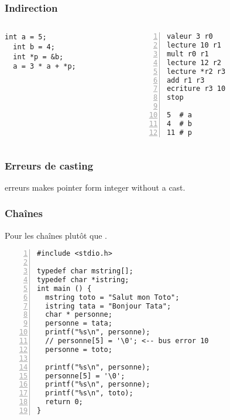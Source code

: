 \documentclass[xcolor=pdftex,svgnames,table]{beamer}
\begin{document}
\begin{frame}[fragile]
  \frametitle{Indirection}

\begin{columns}
\begin{column}[b]{3.7cm}

\begin{lstlisting}[basicstyle=\ttfamily]
  int a = 5;
  int b = 4;
  int *p = &b;
  a = 3 * a + *p;
\end{lstlisting}

\end{column}
\begin{column}[b]{3.7cm}
\begin{lstlisting}[numbers=left,basicstyle=\ttfamily\small]
valeur 3 r0
lecture 10 r1
mult r0 r1
lecture 12 r2
lecture *r2 r3
add r1 r3
ecriture r3 10
stop

5  # a
4  # b
11 # p
\end{lstlisting}
\end{column}
\end{columns}
\end{frame}

\begin{frame}
  \frametitle{Erreurs de casting}
erreurs makes pointer form integer without a cast.
\end{frame}

\begin{frame}[fragile]
  \frametitle{Chaînes}

Pour les chaînes  plutôt que .

\begin{lstlisting}[numbers=left,basicstyle=\ttfamily\small]
#include <stdio.h>

typedef char mstring[];
typedef char *istring;
int main () {
  mstring toto = "Salut mon Toto";
  istring tata = "Bonjour Tata";
  char * personne;
  personne = tata;
  printf("%s\n", personne);
  // personne[5] = '\0'; <-- bus error 10
  personne = toto;

  printf("%s\n", personne);
  personne[5] = '\0';
  printf("%s\n", personne);
  printf("%s\n", toto);
  return 0;
}

\end{lstlisting}


\end{frame}
\end{document}
